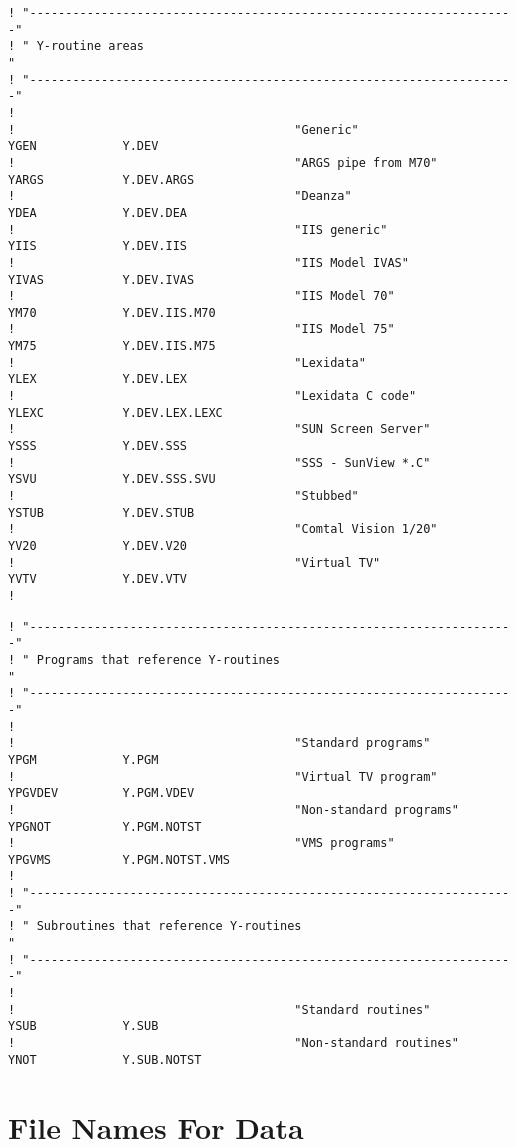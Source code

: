 \begin{verbatim}
! "--------------------------------------------------------------------"
! " Y-routine areas                                                    "
! "--------------------------------------------------------------------"
!
!                                       "Generic"
YGEN            Y.DEV
!                                       "ARGS pipe from M70"
YARGS           Y.DEV.ARGS
!                                       "Deanza"
YDEA            Y.DEV.DEA
!                                       "IIS generic"
YIIS            Y.DEV.IIS
!                                       "IIS Model IVAS"
YIVAS           Y.DEV.IVAS
!                                       "IIS Model 70"
YM70            Y.DEV.IIS.M70
!                                       "IIS Model 75"
YM75            Y.DEV.IIS.M75
!                                       "Lexidata"
YLEX            Y.DEV.LEX
!                                       "Lexidata C code"
YLEXC           Y.DEV.LEX.LEXC
!                                       "SUN Screen Server"
YSSS            Y.DEV.SSS
!                                       "SSS - SunView *.C"
YSVU            Y.DEV.SSS.SVU
!                                       "Stubbed"
YSTUB           Y.DEV.STUB
!                                       "Comtal Vision 1/20"
YV20            Y.DEV.V20
!                                       "Virtual TV"
YVTV            Y.DEV.VTV
!
\end{verbatim}
\begin{verbatim}
! "--------------------------------------------------------------------"
! " Programs that reference Y-routines                                 "
! "--------------------------------------------------------------------"
!
!                                       "Standard programs"
YPGM            Y.PGM
!                                       "Virtual TV program"
YPGVDEV         Y.PGM.VDEV
!                                       "Non-standard programs"
YPGNOT          Y.PGM.NOTST
!                                       "VMS programs"
YPGVMS          Y.PGM.NOTST.VMS
!
! "--------------------------------------------------------------------"
! " Subroutines that reference Y-routines                              "
! "--------------------------------------------------------------------"
!
!                                       "Standard routines"
YSUB            Y.SUB
!                                       "Non-standard routines"
YNOT            Y.SUB.NOTST
\end{verbatim}
\section{File Names For Data}



